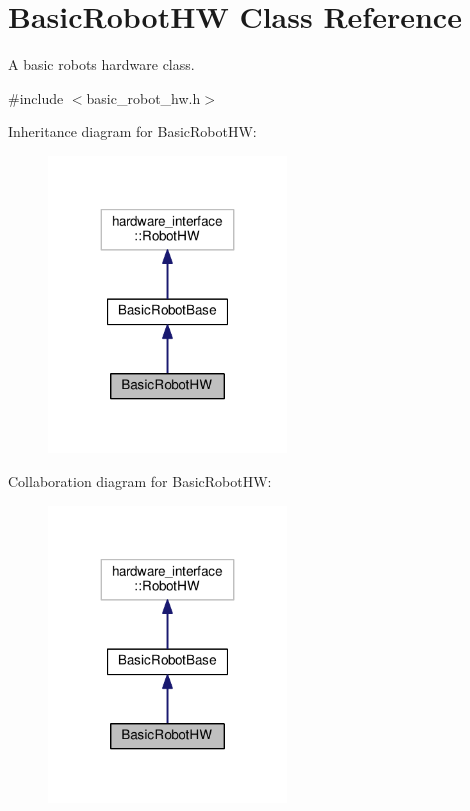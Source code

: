 \hypertarget{classBasicRobotHW}{}\section{Basic\+Robot\+HW Class Reference}
\label{classBasicRobotHW}


A basic robot\textquotesingle{}s hardware class.  




{\ttfamily \#include $<$basic\+\_\+robot\+\_\+hw.\+h$>$}



Inheritance diagram for Basic\+Robot\+HW\+:
\nopagebreak
\begin{figure}[H]
\begin{center}
\leavevmode
\includegraphics[width=179pt]{classBasicRobotHW__inherit__graph}
\end{center}
\end{figure}


Collaboration diagram for Basic\+Robot\+HW\+:
\nopagebreak
\begin{figure}[H]
\begin{center}
\leavevmode
\includegraphics[width=179pt]{classBasicRobotHW__coll__graph}
\end{center}
\end{figure}
